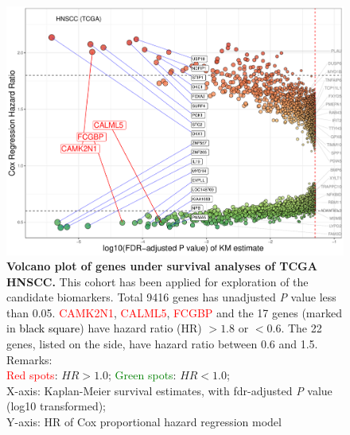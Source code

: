 \documentclass[preprint,12pt]{elsarticle}
\newcommand{\bcaption}[2]{\caption{\textbf{#1} #2}}
\newenvironment{MyColorPar}[1]{%
    \leavevmode\color{#1}\ignorespaces%
}{%
}%
\begin{document}
\begin{MyColorPar}{blue}
\begin{figure}
    \centering
    \includegraphics[width=13cm]{Rplot_TCGA_HNSCC_CoxHR_CAMK2N1_top3FDRKM.pdf}
    \bcaption{Volcano plot of genes under survival analyses of TCGA HNSCC.}{
    This cohort has been applied for exploration of the candidate biomarkers.
    Total 9416 genes has %
    unadjusted \textit{P} value less than 0.05.
    \textcolor{red}{CAMK2N1}, \textcolor{red}{CALML5}, \textcolor{red}{FCGBP} and the 17 genes (marked in \textcolor{black}{black square}) have hazard ratio (HR) $> 1.8$ or $< 0.6$.
    The 22 genes, listed on the side, have hazard ratio between 0.6 and 1.5.\\
    Remarks:\\
    \textcolor{red}{Red spots}: $HR > 1.0$;
    \textcolor{green}{Green spots}: $HR < 1.0$;\\
    X-axis: Kaplan-Meier survival estimates, with \acrshort{fdr}-adjusted \textit{P} value (log10 transformed);\\
    Y-axis: HR of Cox proportional hazard regression model\\
    }
    \label{fig:hazards3}
\end{figure}



\end{MyColorPar}
\end{document}
